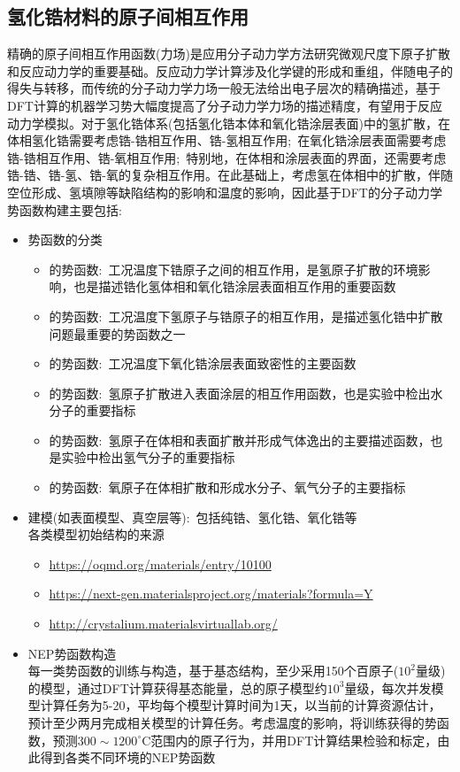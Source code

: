 \subsection{氢化锆材料的原子间相互作用}
精确的原子间相互作用函数(力场)是应用分子动力学方法研究微观尺度下原子扩散和反应动力学的重要基础。反应动力学计算涉及化学键的形成和重组，伴随电子的得失与转移，而传统的分子动力学力场一般无法给出电子层次的精确描述，基于\textrm{DFT}计算的机器学习势大幅度提高了分子动力学力场的描述精度，有望用于反应动力学模拟。对于氢化锆体系(包括氢化锆本体和氧化锆涂层表面)中的氢扩散，在体相氢化锆需要考虑锆-锆相互作用、锆-氢相互作用;~在氧化锆涂层表面需要考虑锆-锆相互作用、锆-氧相互作用;~特别地，在体相和涂层表面的界面，还需要考虑锆-锆、锆-氢、锆-氧的复杂相互作用。在此基础上，考虑氢在体相中的扩散，伴随空位形成、氢填隙等缺陷结构的影响和温度的影响，因此基于\textrm{DFT}的分子动力学势函数构建主要包括:
\begin{itemize}
	\item 势函数的分类
\begin{itemize}
	\item {}的势函数:~工况温度下锆原子之间的相互作用，是氢原子扩散的环境影响，也是描述锆化氢体相和氧化锆涂层表面相互作用的重要函数
	\item {}的势函数:~工况温度下氢原子与锆原子的相互作用，是描述氢化锆中扩散问题最重要的势函数之一
	\item {}的势函数:~工况温度下氧化锆涂层表面致密性的主要函数
	\item {}的势函数:~氢原子扩散进入表面涂层的相互作用函数，也是实验中检出水分子的重要指标
	\item {}的势函数:~氢原子在体相和表面扩散并形成气体逸出的主要描述函数，也是实验中检出氢气分子的重要指标
	\item {}的势函数:~氧原子在体相扩散和形成水分子、氧气分子的主要指标
\end{itemize}
	\item 建模(如表面模型、真空层等):~包括纯锆、氢化锆、氧化锆等\\
各类模型初始结构的来源
		\begin{itemize}
			\item \url{https://oqmd.org/materials/entry/10100}
			\item \url{https://next-gen.materialsproject.org/materials?formula=Y}
			\item \url{http://crystalium.materialsvirtuallab.org/}
		\end{itemize}
	\item \textrm{NEP}势函数构造\\
		每一类势函数的训练与构造，基于基态结构，至少采用150个百原子($10^2$量级)的模型，通过\textrm{DFT}计算获得基态能量，总的原子模型约$10^3$量级，每次并发模型计算任务为5-20，平均每个模型计算时间为1天，以当前的计算资源估计，预计至少两月完成相关模型的计算任务。考虑温度的影响，将训练获得的势函数，预测$300\sim1200^{\circ}\mathrm{C}$范围内的原子行为，并用\textrm{DFT}计算结果检验和标定，由此得到各类不同环境的\textrm{NEP}势函数
\end{itemize}
